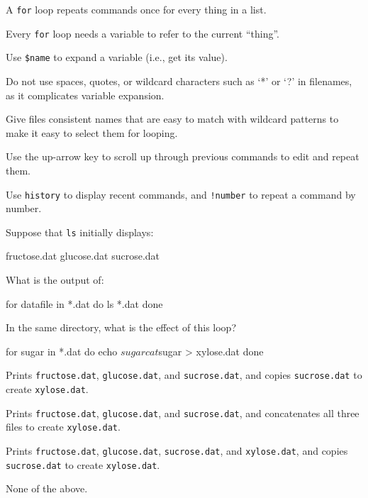 \documentclass{book}
\begin{document}
\begin{keypoints}
\begin{swcitemize}
\item
  A \texttt{for} loop repeats commands once for every thing in a list.
\item
  Every \texttt{for} loop needs a variable to refer to the current
  ``thing''.
\item
  Use \texttt{\$name} to expand a variable (i.e., get its value).
\item
  Do not use spaces, quotes, or wildcard characters such as `*' or `?'
  in filenames, as it complicates variable expansion.
\item
  Give files consistent names that are easy to match with wildcard
  patterns to make it easy to select them for looping.
\item
  Use the up-arrow key to scroll up through previous commands to edit
  and repeat them.
\item
  Use \texttt{history} to display recent commands, and \texttt{!number}
  to repeat a command by number.
\end{swcitemize}
\end{keypoints}

\begin{challenge}
  Suppose that \texttt{ls} initially displays:

\begin{VerbOut}
fructose.dat    glucose.dat   sucrose.dat
\end{VerbOut}

  What is the output of:

\begin{VerbIn}
for datafile in *.dat
do
    ls *.dat
done
\end{VerbIn}
\end{challenge}

\begin{challenge}
  In the same directory, what is the effect of this loop?

\begin{VerbIn}
for sugar in *.dat
do
    echo $sugar
    cat $sugar > xylose.dat
done
\end{VerbIn}

  \begin{swcenumerate}
  \item
    Prints \texttt{fructose.dat}, \texttt{glucose.dat}, and
    \texttt{sucrose.dat}, and copies \texttt{sucrose.dat} to create
    \texttt{xylose.dat}.
  \item
    Prints \texttt{fructose.dat}, \texttt{glucose.dat}, and
    \texttt{sucrose.dat}, and concatenates all three files to create
    \texttt{xylose.dat}.
  \item
    Prints \texttt{fructose.dat}, \texttt{glucose.dat},
    \texttt{sucrose.dat}, and \texttt{xylose.dat}, and copies
    \texttt{sucrose.dat} to create \texttt{xylose.dat}.
  \item
    None of the above.
  \end{swcenumerate}
\end{challenge}
\end{document}

